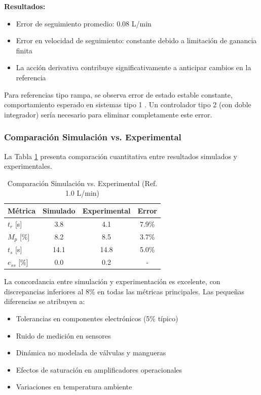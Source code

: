\documentclass[conference]{IEEEtran}
\begin{document}
\textbf{Resultados:}
\begin{itemize}
\item Error de seguimiento promedio: 0.08 L/min
\item Error en velocidad de seguimiento: constante debido a limitación de ganancia finita
\item La acción derivativa contribuye significativamente a anticipar cambios en la referencia
\end{itemize}

Para referencias tipo rampa, se observa error de estado estable constante, comportamiento esperado en sistemas tipo 1 \cite{ogata}. Un controlador tipo 2 (con doble integrador) sería necesario para eliminar completamente este error.

\subsubsection{Comparación Simulación vs. Experimental}

La Tabla \ref{tab:comp_sim_exp} presenta comparación cuantitativa entre resultados simulados y experimentales.

\begin{table}[htbp]
\centering
\caption{Comparación Simulación vs. Experimental (Ref. 1.0 L/min)}
\label{tab:comp_sim_exp}
\begin{tabular}{lccc}
\toprule
\textbf{Métrica} & \textbf{Simulado} & \textbf{Experimental} & \textbf{Error} \\
\midrule
$t_r$ [s] & 3.8 & 4.1 & 7.9\% \\
$M_p$ [\%] & 8.2 & 8.5 & 3.7\% \\
$t_s$ [s] & 14.1 & 14.8 & 5.0\% \\
$e_{ss}$ [\%] & 0.0 & 0.2 & - \\
\bottomrule
\end{tabular}
\end{table}

La concordancia entre simulación y experimentación es excelente, con discrepancias inferiores al 8\% en todas las métricas principales. Las pequeñas diferencias se atribuyen a:

\begin{itemize}
\item Tolerancias en componentes electrónicos (5\% típico)
\item Ruido de medición en sensores
\item Dinámica no modelada de válvulas y mangueras
\item Efectos de saturación en amplificadores operacionales
\item Variaciones en temperatura ambiente
\end{itemize}
\end{document}
